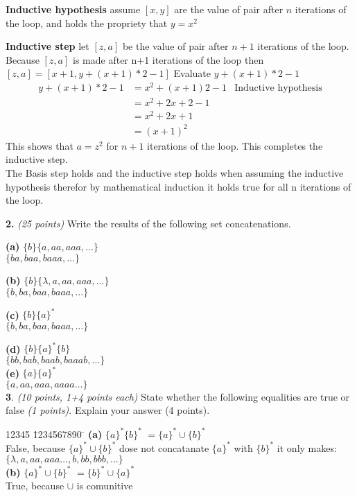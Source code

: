 \documentclass[12pt]{article}
\begin{document}
{\bf Inductive hypothesis}
assume $[x,y]$ are the value of pair after $n$ iterations of the loop, and holds the propriety that $y = x^2$

{\bf Inductive step}
let $[z,a]$ be the value of pair after $n+1$ iterations of the loop. Because $[z,a]$ is made after n+1 iterations of the loop then $[z,a]= [x+1,y+(x+1)*2-1]$ Evaluate $y+(x+1)*2-1$
\begin{align*}
y+(x+1)*2-1 &= x^2+(x+1)2-1 & \text{Inductive hypothesis}\\
&= x^2+2x+2-1\\
&=x^2+2x+1\\
&=(x+1)^2
\end{align*}
This shows that $a=z^2$ for $ n + 1 $ iterations of the loop. This completes the inductive step.\\
The Basis step holds and the inductive step holds when assuming the inductive hypothesis therefor by mathematical induction it holds true for all n iterations of the loop.

\newpage
{\bf 2.} {\em (25 points)} Write the results of the following set
concatenations.

{\bf (a)} $\{ b \} \{ a, aa, aaa, \ldots \}$\\
$\{ba,baa,baaa,\ldots\}$

{\bf (b)} $\{ b \} \{ \lambda, a, aa, aaa, \ldots \}$\\
$\{b,ba,baa,baaa,\ldots\}$

{\bf (c)} $\{ b \} \{ a \}^*$\\
$\{b,ba,baa,baaa,\ldots\}$

{\bf (d)} $\{ b \} \{ a \}^* \{ b \} $\\
$\{bb,bab,baab,baaab,\ldots\}$\\
{\bf (e)} $\{ a \} \{ a \}^*$\\
$\{a,aa,aaa,aaaa\ldots\}$\\

\vspace{0.2in}
{\bf 3}. {\em (10 points, 1+4 points each)}
State whether the following equalities are true or false {\em (1 points)}.
Explain your answer {(4 points)}.

\begin{tabbing}
12345 \= 1234567890 \= \kill
{\bf (a)}
\>
$ \{a\}^* \{b\}^*$ \> $ = \{a\}^* \cup \{b\}^* $
\\
False, because $\{a\}^* \cup \{b\}^* $ dose not concatanate $\{a\}^*$ with $\{b\}^*$ it only makes:\\ $\{\lambda, a ,aa ,aaa\ldots,b,bb,bbb,\ldots\}$\\


{\bf (b)}
\>
$\{a\}^* \cup \{b\}^*$ \> $ = \{b\}^* \cup \{a\}^*$\\
True, because $\cup$ is comunitive

\end{tabbing}
\end{document}
